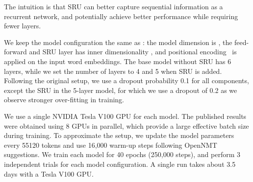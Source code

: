 \documentclass[11pt,a4paper]{article}
\begin{document}
The intuition is that SRU can better capture sequential information as a recurrent network, and potentially achieve better performance while requiring fewer layers.


We keep the model configuration the same as \citet{vaswani2017attention}:
the model dimension is , the feed-forward and SRU layer has inner dimensionality , and positional encoding~\cite{gehring2017convolutional} is applied on the input word embeddings.
The base model without SRU has 6 layers, while we set the number of layers to 4 and 5 when SRU is added.
Following the original setup, we use a dropout probability 0.1 for all components, except the SRU in the 5-layer model, for which we use a dropout of 0.2 as we observe stronger over-fitting in training.

We use a single NVIDIA Tesla V100 GPU for each model.
The published results were obtained using 8 GPUs in parallel, which provide a large effective batch size during training.
To approximate the setup, we update the model parameters every 55120 tokens and use 16,000 warm-up steps following OpenNMT suggestions.
We train each model for 40 epochs (250,000 steps), and perform 3 independent trials for each model configuration. A single run takes about 3.5 days with a Tesla V100 GPU.
\end{document}
